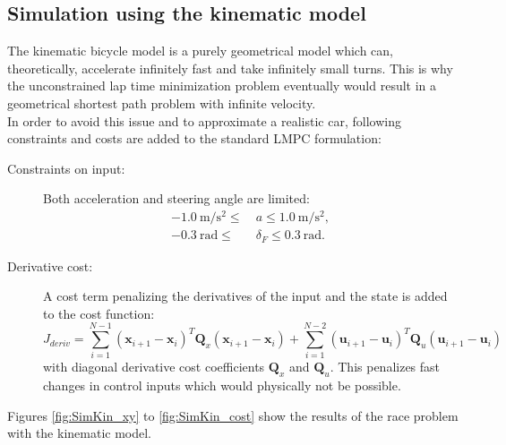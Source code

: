 \subsection{Simulation using the kinematic model}
The kinematic bicycle model is a purely geometrical model which can, theoretically, accelerate infinitely fast and take infinitely small turns. This is why the unconstrained lap time minimization problem eventually would result in a geometrical shortest path problem with infinite velocity.\\
In order to avoid this issue and to approximate a realistic car, following constraints and costs are added to the standard LMPC formulation:
\begin{description}
\item[Constraints on input:] Both acceleration and steering angle are limited:
\begin{align*}
-\SI{1.0}{\meter\per\square\second} \leq\  &a \leq \SI{1.0}{\meter\per\square\second},\\
-\SI{0.3}{\radian} \leq\ &\delta_F \leq \SI{0.3}{\radian}.
\end{align*}
\item[Derivative cost:] A cost term penalizing the derivatives of the input and the state is added to the cost function:
\begin{equation}
J_{deriv} = \sum_{i=1}^{N-1} (\bm{x}_{i+1}-\bm{x}_i)^T \bm{Q}_x (\bm{x}_{i+1}-\bm{x}_i)+\sum_{i=1}^{N-2} (\bm{u}_{i+1}-\bm{u}_i)^T \bm{Q}_u (\bm{u}_{i+1}-\bm{u}_i)
\end{equation}
with diagonal derivative cost coefficients $\bm{Q}_x$ and $\bm{Q}_u$. This penalizes fast changes in control inputs which would physically not be possible.
\end{description}
Figures \ref{fig:SimKin_xy} to \ref{fig:SimKin_cost} show the results of the race problem with the kinematic model.\\
